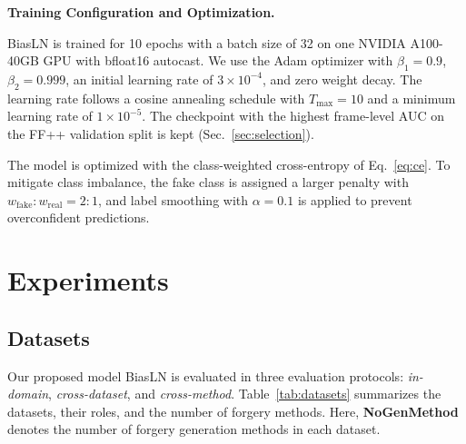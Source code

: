 \documentclass[fonts]{icst}
\newif\ifrevmark\revmarkfalse
\newcommand{\rev}[1]{\ifrevmark{\color{revblue}#1}\else#1\fi}
\begin{document}
\noindent\textbf{Training Configuration and Optimization.}\par
BiasLN is trained for 10 epochs with a batch size of 32 on \rev{one NVIDIA A100-40GB GPU with bfloat16 autocast}.
We use the Adam optimizer with $\beta_1 = 0.9$, $\beta_2 = 0.999$, an initial learning rate of $3 \times 10^{-4}$, and zero weight decay.
The learning rate follows a cosine annealing schedule with $T_{\max}=10$ and a minimum learning rate of $1 \times 10^{-5}$.
\rev{The checkpoint with the highest frame-level AUC on the FF++ validation split is kept (Sec.~\ref{sec:selection}).}

The model is optimized with \rev{the} class-weighted cross-entropy \rev{of Eq.~\eqref{eq:ce}}. To mitigate class imbalance, the fake class is assigned a larger penalty with $w_{\mathrm{fake}}:w_{\mathrm{real}} = 2:1$, and label smoothing with $\alpha = 0.1$ is applied to prevent overconfident predictions.

\section{Experiments}
\subsection{Datasets}
\label{sec:datasets}
\label{sec:protocol}

Our proposed model BiasLN \rev{is} evaluated in three evaluation protocols: \textit{in-domain}, \textit{cross-dataset}, and \textit{cross-method}.
Table~\ref{tab:datasets} summarizes the datasets, their roles, and the number of forgery methods.
Here, \textbf{NoGenMethod} denotes the number of forgery generation methods in each dataset.
\end{document}
